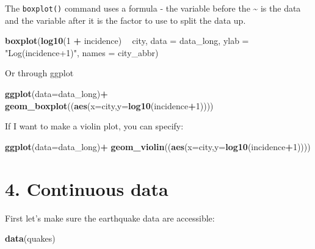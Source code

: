 \documentclass[11pt,]{article}
\newenvironment{Shaded}{\begin{snugshade}}{\end{snugshade}}
\newcommand{\KeywordTok}[1]{\textcolor[rgb]{0.13,0.29,0.53}{\textbf{#1}}}
\newcommand{\DataTypeTok}[1]{\textcolor[rgb]{0.13,0.29,0.53}{#1}}
\newcommand{\DecValTok}[1]{\textcolor[rgb]{0.00,0.00,0.81}{#1}}
\newcommand{\StringTok}[1]{\textcolor[rgb]{0.31,0.60,0.02}{#1}}
\newcommand{\OperatorTok}[1]{\textcolor[rgb]{0.81,0.36,0.00}{\textbf{#1}}}
\newcommand{\NormalTok}[1]{#1}
\begin{document}
The \texttt{boxplot()} command uses a formula - the variable before the
\textasciitilde{} is the data and the variable after it is the factor to
use to split the data up.

\begin{Shaded}
\begin{Highlighting}[]
\KeywordTok{boxplot}\NormalTok{(}\KeywordTok{log10}\NormalTok{(}\DecValTok{1} \OperatorTok{+}\StringTok{ }\NormalTok{incidence) }\OperatorTok{~}\StringTok{ }\NormalTok{city, }\DataTypeTok{data =}\NormalTok{ data_long, }\DataTypeTok{ylab =} \StringTok{"Log(incidence+1)"}\NormalTok{,}
 \DataTypeTok{names =}\NormalTok{ city_abbr)}
\end{Highlighting}
\end{Shaded}

Or through ggplot

\begin{Shaded}
\begin{Highlighting}[]
\KeywordTok{ggplot}\NormalTok{(}\DataTypeTok{data=}\NormalTok{data_long)}\OperatorTok{+}
\StringTok{  }\KeywordTok{geom_boxplot}\NormalTok{((}\KeywordTok{aes}\NormalTok{(}\DataTypeTok{x=}\NormalTok{city,}\DataTypeTok{y=}\KeywordTok{log10}\NormalTok{(incidence}\OperatorTok{+}\DecValTok{1}\NormalTok{))))}
\end{Highlighting}
\end{Shaded}

If I want to make a violin plot, you can specify:

\begin{Shaded}
\begin{Highlighting}[]
\KeywordTok{ggplot}\NormalTok{(}\DataTypeTok{data=}\NormalTok{data_long)}\OperatorTok{+}
\StringTok{  }\KeywordTok{geom_violin}\NormalTok{((}\KeywordTok{aes}\NormalTok{(}\DataTypeTok{x=}\NormalTok{city,}\DataTypeTok{y=}\KeywordTok{log10}\NormalTok{(incidence}\OperatorTok{+}\DecValTok{1}\NormalTok{))))}
\end{Highlighting}
\end{Shaded}

\section{4. Continuous data}\label{continuous-data}

First let's make sure the earthquake data are accessible:

\begin{Shaded}
\begin{Highlighting}[]
\KeywordTok{data}\NormalTok{(quakes)}
\end{Highlighting}
\end{Shaded}
\end{document}

